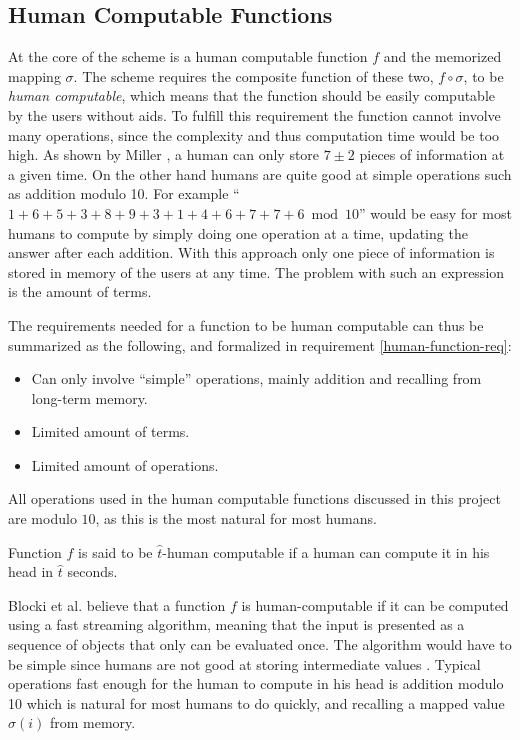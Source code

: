 \subsection{Human Computable Functions}\label{human-func}
At the core of the scheme is a human computable function $f$ and the memorized mapping $\sigma$. The scheme requires the composite function of these two, $f \circ \sigma$, to be \emph{human computable}, which means that the function should be easily computable by the users without aids. To fulfill this requirement the function cannot involve many operations, since the complexity and thus computation time would be too high. As shown by Miller \cite{magic-seven_miller}, a human can only store $7 \pm 2$ pieces of information at a given time. On the other hand humans are quite good at simple operations such as addition modulo 10. For example ``$1+6+5+3+8+9+3+1+4+6+7+7+6 \bmod 10$'' would be easy for most humans to compute by simply doing one operation at a time, updating the answer after each addition. With this approach only one piece of information is stored in memory of the users at any time. The problem with such an expression is the amount of terms. 
\par The requirements needed for a function to be human computable can thus be summarized as the following, and formalized in requirement \ref{human-function-req}:
\begin{itemize}
    \item Can only involve ``simple'' operations, mainly addition and recalling from long-term memory.
    \item Limited amount of terms.
    \item Limited amount of operations.
\end{itemize}
\begin{remark}
    All operations used in the human computable functions discussed in this project are modulo $10$, as this is the most natural for most humans.
\end{remark}
\begin{requirement}
    \label{human-function-req}
    Function $f$ is said to be $\hat t$-human computable if a human can compute it in his head in $\hat t$ seconds.
\end{requirement}

\par Blocki et al. \cite{hcp-blocki} believe that a function $f$ is human-computable if it can be computed using a fast streaming algorithm, meaning that the input is presented as a sequence of objects that only can be evaluated once. The algorithm would have to be simple since humans are not good at storing intermediate values \cite{magic-seven_miller}. Typical operations fast enough for the human to compute in his head is addition modulo 10 which is natural for most humans to do quickly, and recalling a mapped value $\sigma(i)$ from memory.




